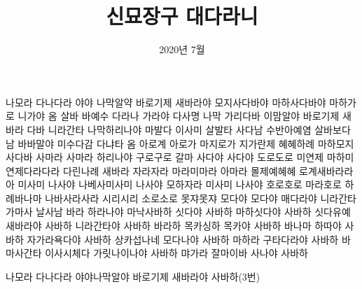 \documentclass[25pt, a2paper ]{tikzposter}
\title{ 신묘장구 대다라니  }
\author{ 2020년 7월 }
\begin{document}
	\maketitle





			{
				\begin{LARGE}

나모라 다나다라 야야 나막알약 바로기제 새바라야 모지사다바야 마하사다바야 마하가로 니가야 옴 살바 바예수 다라나 가라야 다사명 나막 가리다바 이맘알야 바로기제 새바라 다바 니라간타 나막하리나야 마발다 이사미 살발타 사다남 수반아예염 살바보다남 바바말야 미수다감 다냐타 옴 아로계 아로가 마지로가 지가란제 혜혜하례 마하모지 사다바 사마라 사마라 하리나야 구로구로 갈마 사다야 사다야 도로도로 미연제 마하미연제다라다라 다린나례 새바라 자라자라 마라미마라 아마라 몰제예혜혜 로계새바라라아 미사미 나사야 나베사미사미 나사야 모하자라 미사미 나사야 호로호로 마라호로 하례바나마 나바사라사라 시리시리 소로소로 못쟈못쟈 모다야 모다야 매다라야 니라간타 가마사 날사남 바라 하라나야 마낙사바하 싯다야 사바하 마하싯다야 사바하 싯다유예 새바라야 사바하 니라간타야 사바하 바라하 목카싱하 목카야 사바하 바나마 하따야 사바하 자가라욕다야 사바하 상카섭나네 모다나야 사바하 마하라 구타다라야 사바하 바마사간타 이사시체다 가릿나이나야 사바하 먀가라 잘마이바 사나야 사바하

나모라 다나다라 야야나막알야 바로기제 새바라야 사바하(3번)

				\end{LARGE}
			}
\end{document}
